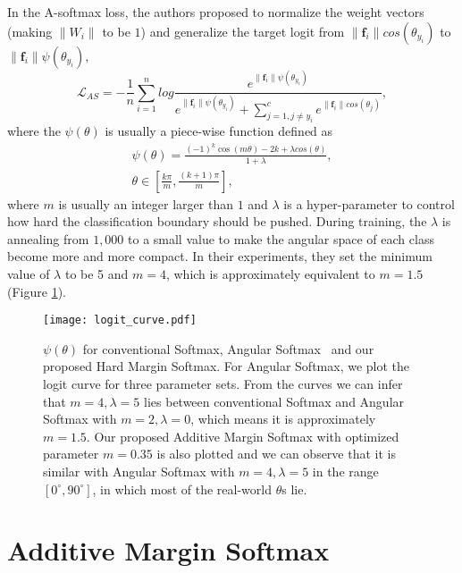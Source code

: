 \documentclass[10pt,twocolumn,letterpaper]{article}
\begin{document}
In the A-softmax loss, the authors proposed to normalize the weight vectors (making $\|W_i\|$ to be $1$) and generalize the target logit from $\|\bm{f}_i\|cos(\theta _{y_i})$ to $\|\bm{f}_i\|\psi(\theta _{y_i})$,
\begin{equation}
\mathcal{L}_{AS}  = -\frac{1}{n}\sum_{i=1}^n{log\frac{e^{\|\bm{f}_i\|\psi(\theta _{y_i})}}{e^{\|\bm{f}_i\|\psi(\theta _{y_i})} + \sum_{j=1,j\neq y_i}^{c}{e^{\|\bm{f}_i\| cos(\theta_{j})}}}},
\label{eq:a-softmax}
\end{equation}
where the $\psi(\theta)$ is usually a piece-wise function defined as
\begin{equation}
\begin{split}
\psi(\theta)=\frac{(-1)^k\cos(m\theta)-2k + \lambda cos(\theta)}{1+\lambda}, \\
\theta\in[\frac{k\pi}{m},\frac{(k+1)\pi}{m}],
\end{split}
\label{eq:psi_sphereface}
\end{equation}
where $m$ is usually an integer larger than $1$ and $\lambda$ is a hyper-parameter to control how hard the classification boundary should be pushed. During training, the $\lambda$ is annealing from $1,000$ to a small value to make the angular space of each class become more and more compact. In their experiments, they set the minimum value of $\lambda$ to be 5 and $m = 4$, which is approximately equivalent to $m = 1.5$ (Figure \ref{fig:logit_curve}). 

\begin{figure}
	\centering
	\texttt{[image: logit\_curve.pdf]}
	\caption{ $\psi(\theta)$ for conventional Softmax, Angular Softmax~\cite{liu2017sphereface} and our proposed Hard Margin Softmax. For Angular Softmax, we plot the logit curve for three parameter sets. From the curves we can infer that $m = 4, \lambda = 5$ lies between conventional Softmax and Angular Softmax with $m = 2, \lambda = 0$, which means it is approximately $m = 1.5$. Our proposed Additive Margin Softmax with optimized parameter $m=0.35$ is also plotted and we can observe that it is similar with Angular Softmax with $m =4, \lambda = 5$ in the range $[0^\circ, 90^\circ]$, in which most of the real-world $\theta$s lie. }
	\label{fig:logit_curve}
\end{figure}

\section{Additive Margin Softmax}
\end{document}
